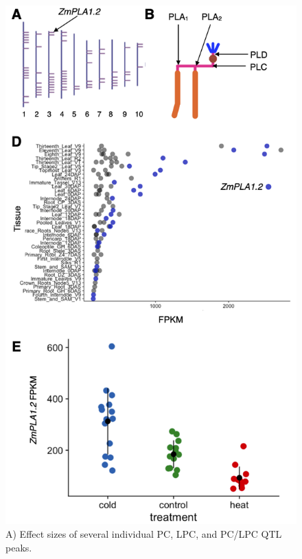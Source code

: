 \documentclass[9pt,twocolumn,twoside,lineno]{BioRxiv}
\begin{document}
\begin{figure}[t]
\begin{center}
\includegraphics[width=0.8\paperwidth]{Sup_Figures/Sup_Fig_3.png}
\caption{A) Effect sizes of several individual PC, LPC, and PC/LPC QTL peaks.
}
\label{SupFig4}
\end{center}
\end{figure}  
\end{document}
